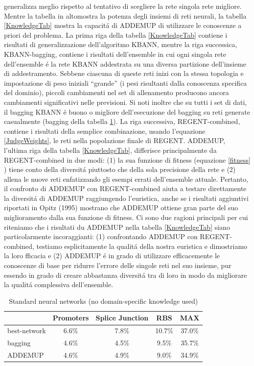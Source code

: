 \documentclass[a4paper,10pt]{article}
\begin{document}
generalizza meglio rispetto al tentativo di scegliere la rete singola rete migliore. Mentre la tabella in altomostra la potenza degli insiemi di reti neurali, la tabella \ref{KnowledgeTab} mostra la capacit\'a di ADDEMUP di utilizzare le conoscenze a priori del problema. La prima riga della tabella \ref{KnowledgeTab} contiene i risultati di generalizzazione dell'algoritmo KBANN, mentre la riga successica, KBANN-bagging, contiene i risultati dell'ensemble in cui ogni singola rete dell'ensemble \'e la rete KBANN addestrata su una diversa partizione dell'insieme di  addestramento. Sebbene ciascuna di queste reti inizi con la stessa topologia e impostazione di peso iniziali ``grande'' (i pesi risultanti dalla conoscenza specifica del dominio), piccoli cambiamenti nel set di allenamento producono ancora cambiamenti significativi nelle previsioni. Si noti inoltre che su tutti i set di dati, il bagging KBANN \'e buono o migliore dell'esecuzione del bagging su reti generate casualmente (bagging della tabella \ref{NoKnowledgeTab}). La riga successiva, REGENT-combined, contiene i risultati della semplice combinazione, usando l'equazione \ref{JudgeWeights}, le reti nella popolazione finale di REGENT. ADDEMUP, l'ultima riga della tabella \ref{KnowledgeTab}, differisce principalmente da REGENT-combined in due modi: (1) la sua funzione di fitness (equazione \ref{fitness} ) tiene conto della diversit\'a piuttosto che della sola precisione della rete e (2) allena le nuove reti enfatizzando gli esempi errati dell'ensemble attuale. Pertanto, il confronto di ADDEMUP con REGENT-combined aiuta a testare direttamente la diversit\'a di ADDEMUP raggiungendo l'euristica, anche se i risultati aggiuntivi riportati in Opitz (1995) mostrano che ADDEMUP ottiene gran parte del suo miglioramento dalla sua funzione di fitness. Ci sono due ragioni principali per cui riteniamo che i risultati du ADDEMUP nella tabella \ref{KnowledgeTab} siano particolarmente incoraggianti: (1) confrontando ADDEMUP con REGENT-combined, testiamo esplicitamente la qualit\'a della nostra euristica e dimostriamo la loro fficacia e (2) ADDEMUP \'e in grado di utilizzare efficacemente le conoscenze di base per ridurre l'errore delle singole reti nel suo insieme, pur essendo in grado di creare abbastanza diversit\'a tra di loro in modo da migliorare la qualit\'a complessiva dell'ensemble. 
  
  \begin{table}[h]\caption{Standard neural networks (no domain-specific knowledge used)} \label{NoKnowledgeTab}
   \centering
   \begin{tabular}[h]{|l|c|c|c|c|}
    \hline
    & Promoters & Splice Junction & RBS & MAX \\ \hline
   best-network & 6.6\% & 7.8\% & 10.7\% & 37.0\% \\ 
   bagging & 4.6\% & 4.5\% & 9.5\% & 35.7\% \\
   ADDEMUP & 4.6\% & 4.9\% & 9.0\% & 34.9\% \\ \hline
   \end{tabular}
  \end{table}
  
\end{document}
